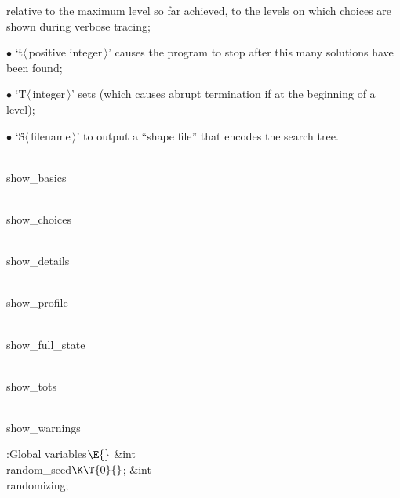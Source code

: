 relative to the maximum level so far achieved, to the levels on which
choices are shown during verbose tracing;
\item{$\bullet$}
`\.t$\langle\,$positive integer$\,\rangle$' causes the program to
stop after this many solutions have been found;
\item{$\bullet$}
`\.T$\langle\,$integer$\,\rangle$' sets  (which causes abrupt
termination if  at the beginning of a level);
\item{$\bullet$}
`\.S$\langle\,$filename$\,\rangle$' to output a ``shape file'' that encodes
the search tree.

\Y\B\4\D\\{show\_basics}\5
\par
\B\4\D\\{show\_choices}\5
\par
\B\4\D\\{show\_details}\5
\par
\B\4\D\\{show\_profile}\5
\par
\B\4\D\\{show\_full\_state}\5
\par
\B\4\D\\{show\_tots}\5
\par
\B\4\D\\{show\_warnings}\5
\par
\Y\B\4:Global variables\X${}\E{}$\6
\&{int} \\{random\_seed}${}\K\T{0}{}$;\6
\&{int} \\{randomizing};\6
